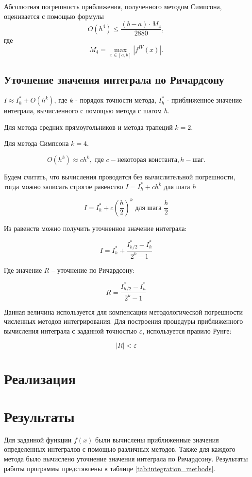 \documentclass[a4paper, 14pt]{extarticle}
\begin{document}
Абсолютная погрешность приближения, полученного методом Симпсона, оценивается с помощью формулы
\[
O(h^4) \leq \frac{(b-a) \cdot M_4}{2880},
\]
где
\[
M_4 = \max_{x \in [a,b]} |f^{IV}(x)|.
\]

\subsection{Уточнение значения интеграла по Ричардсону}


$I \approx I_h^* + O(h^k)$,  где  $k$ - порядок точности метода, 
$I_h^*$ - приближенное значение интеграла, вычисленного с помощью метода с шагом  $h$.


Для метода средних прямоугольников и метода трапеций $k = 2$.

Для метода Симпсона $k = 4$.

\[
O(h^k) \approx ch^k, \text{ где } c - \text{некоторая константа}, h - \text{шаг}.
\]

Будем считать, что вычисления проводятся без вычислительной погрешности, тогда можно 
записать строгое равенство $I = I_h^* + ch^k$ для шага $h$

\[
I = I_h^* + c \left( \frac{h}{2} \right)^k \text{ для шага } \frac{h}{2}
\]

Из равенств можно получить уточненное значение интеграла:

\[
I = I_h^* + \frac{I_{h/2}^* - I_{h}^*}{2^k - 1}
\]

Где значение $R$ -- уточнение по Ричардсону:

\[
R = \frac{I_{h/2}^* - I_{h}^*}{2^k - 1}
\]

Данная величина используется для компенсации методологической погрешности 
численных методов интегрирования. Для построения процедуры приближенного 
вычисления интеграла с заданной точностью $\varepsilon$, используется правило Рунге:

\[
|R| < \varepsilon
\]


\section{Реализация}




\section{Результаты}
Для заданной функции $f(x)$ были вычислены приближенные значения определенных интегралов с помощью различных методов.
Также для каждого метода было вычислено уточнение значения интеграла по Ричардсону. Результаты работы программы представлены в таблице \ref{tab:integration_methods}.
\end{document}
